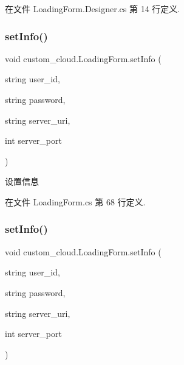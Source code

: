 在文件 Loading\+Form.\+Designer.\+cs 第 14 行定义.

\mbox{\label{classcustom__cloud_1_1_loading_form_a71b1980aedb2a407f02863972b7ca19b}} 
\subsubsection{\texorpdfstring{set\+Info()}{setInfo()}\hspace{0.1cm}{\footnotesize\ttfamily [1/2]}}
{\footnotesize\ttfamily void custom\+\_\+cloud.\+Loading\+Form.\+set\+Info (\begin{DoxyParamCaption}\item[{string}]{user\+\_\+id,  }\item[{string}]{password,  }\item[{string}]{server\+\_\+uri,  }\item[{int}]{server\+\_\+port }\end{DoxyParamCaption})}



设置信息 



在文件 Loading\+Form.\+cs 第 68 行定义.

\mbox{\label{classcustom__cloud_1_1_loading_form_a71b1980aedb2a407f02863972b7ca19b}} 
\subsubsection{\texorpdfstring{set\+Info()}{setInfo()}\hspace{0.1cm}{\footnotesize\ttfamily [2/2]}}
{\footnotesize\ttfamily void custom\+\_\+cloud.\+Loading\+Form.\+set\+Info (\begin{DoxyParamCaption}\item[{string}]{user\+\_\+id,  }\item[{string}]{password,  }\item[{string}]{server\+\_\+uri,  }\item[{int}]{server\+\_\+port }\end{DoxyParamCaption})}



